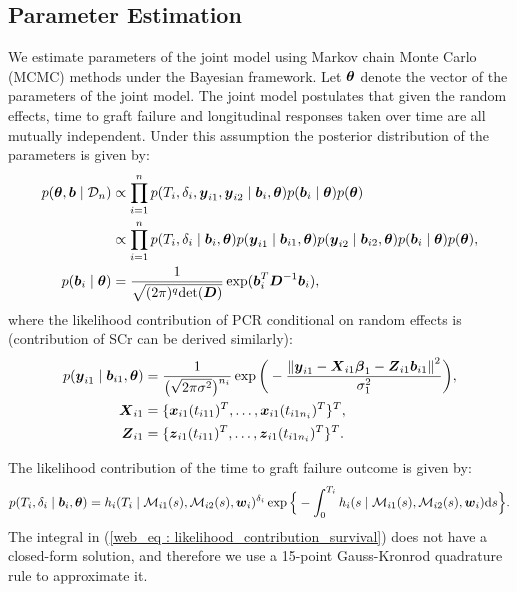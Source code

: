 \subsection{Parameter Estimation}
We estimate parameters of the joint model using Markov chain Monte Carlo (MCMC) methods under the Bayesian framework. Let $\boldsymbol{\theta}$ denote the vector of the parameters of the joint model. The joint model postulates that given the random effects, time to graft failure and longitudinal responses taken over time are all mutually independent. Under this assumption the posterior distribution of the parameters is given by:
\begin{align*}
p(\boldsymbol{\theta}, \boldsymbol{b} \mid \mathcal{D}_n) & \propto \prod_{i=1}^n p(T_i, \delta_i, \boldsymbol{y}_{i1},\boldsymbol{y}_{i2} \mid \boldsymbol{b}_{i}, \boldsymbol{\theta}) p(\boldsymbol{b}_{i} \mid \boldsymbol{\theta}) p(\boldsymbol{\theta})\\
& \propto \prod_{i=1}^n p(T_i, \delta_i \mid \boldsymbol{b}_i, \boldsymbol{\theta}) p(\boldsymbol{y}_{i1} \mid \boldsymbol{b}_{i1}, \boldsymbol{\theta}) p(\boldsymbol{y}_{i2} \mid \boldsymbol{b}_{i2}, \boldsymbol{\theta}) p(\boldsymbol{b}_i \mid \boldsymbol{\theta}) p(\boldsymbol{\theta}),\\
p(\boldsymbol{b}_i \mid \boldsymbol{\theta}) &= \frac{1}{\sqrt{(2 \pi)^q \text{det}(\boldsymbol{D})}} \exp(\boldsymbol{b}_i^T \boldsymbol{D}^{-1} \boldsymbol{b}_i),
\end{align*}
where the likelihood contribution of PCR conditional on random effects is (contribution of SCr can be derived similarly):
\begin{align*}
p(\boldsymbol{y}_{i1} \mid \boldsymbol{b}_{i1}, \boldsymbol{\theta}) &= \frac{1}{\big(\sqrt{2 \pi \sigma^2}\big)^{n_i}} \exp\bigg(-\frac{{\lVert{\boldsymbol{y}_{i1} - \boldsymbol{X}_{i1}\boldsymbol{\beta}_1 - \boldsymbol{Z}_{i1}\boldsymbol{b}_{i1}}\rVert}^2}{\sigma_1^2}\bigg),\\
\boldsymbol{X}_{i1} &= \{\boldsymbol{x}_{i1}(t_{i11})^T, \ldots, \boldsymbol{x}_{i1}(t_{i1n_i})^T\}^T,\\
\boldsymbol{Z}_{i1} &= \{\boldsymbol{z}_{i1}(t_{i11})^T, \ldots, \boldsymbol{z}_{i1}(t_{i1n_i})^T\}^T.
\end{align*}

The likelihood contribution of the time to graft failure outcome is given by:
\begin{equation}
\label{web_eq : likelihood_contribution_survival}
p(T_i, \delta_i \mid \boldsymbol{b}_i,\boldsymbol{\theta}) = h_i(T_i \mid \mathcal{M}_{i1}(s), \mathcal{M}_{i2}(s), \boldsymbol{w}_i)^{\delta_i} \exp\Big\{-\int_0^{T_i} h_i(s \mid \mathcal{M}_{i1}(s), \mathcal{M}_{i2}(s), \boldsymbol{w}_i)\mathrm{d}{s}\Big\}.
\end{equation}
The integral in (\ref{web_eq : likelihood_contribution_survival}) does not have a closed-form solution, and therefore we use a 15-point Gauss-Kronrod quadrature rule to approximate it.

